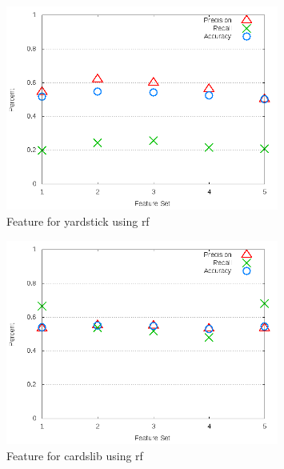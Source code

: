 \begin{figure}
\centering
\includegraphics[width=0.8\textwidth]{images/rf/test_3/yardstick_sample_range.png}
\caption{Feature for yardstick using \gls{rf}}
\label{fig:test_3_yardstick_rf}
\end{figure}

\clearpage

\begin{figure}[!t]
\centering
\includegraphics[width=0.8\textwidth]{images/rf/test_3/cardslib_sample_range.png}
\caption{Feature for cardslib using \gls{rf}}
\label{fig:test_3_cardslib_rf}
\end{figure}

